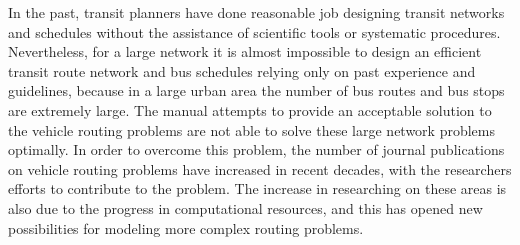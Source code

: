 
In the past, transit planners have done reasonable job designing transit networks and schedules without the assistance of scientific tools or systematic procedures. Nevertheless, for a large network it is almost impossible to design an efficient transit route network and bus schedules relying only on past experience and guidelines, because in a large urban area the number of bus routes and bus stops are extremely large. The manual attempts to provide an acceptable solution to the vehicle routing problems are not able to solve these large network problems optimally. In order to overcome this problem, the number of journal publications on vehicle routing problems have increased in recent decades, with the researchers efforts to contribute to the problem.  The increase in researching on these areas is also due to the progress in computational resources, and this has opened new possibilities for modeling more complex routing problems. %
